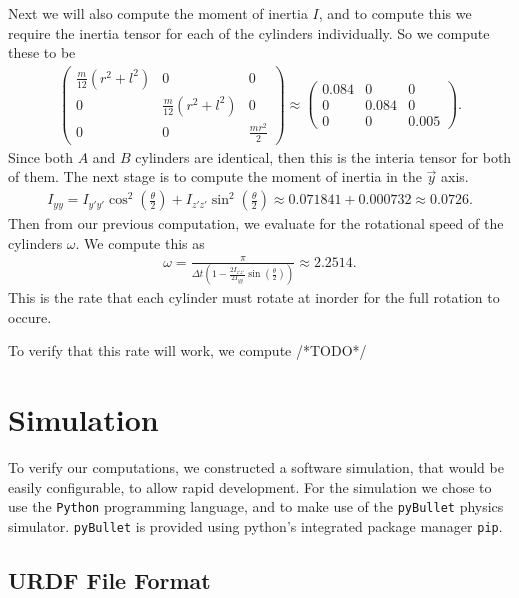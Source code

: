 \documentclass[12]{amsart}
\theoremstyle{definition}
\begin{document}
Next we will also compute the moment of inertia $I$, and to compute this
we require the inertia tensor for each of the cylinders individually. So we
compute these to be
\begin{align*}
   \begin{pmatrix}
     \frac{m}{12}\left(r^2+l^2\right) & 0 & 0\\
     0 & \frac{m}{12}\left(r^2+l^2\right) & 0\\
     0 & 0 & \frac{mr^2}{2}
   \end{pmatrix}\approx
   \begin{pmatrix}
     0.084 & 0 & 0\\
     0 & 0.084 & 0\\
     0 & 0 & 0.005
   \end{pmatrix}.
\end{align*}
Since both $A$ and $B$ cylinders are identical, then this is the interia tensor
for both of them. The next stage is to compute the moment of inertia in the
$\vec{y}$ axis.
\begin{align*}
   I_{yy}=I_{y'y'}\cos^2\left(\frac{\theta}{2}\right)+I_{z'z'}\sin^2\left(\frac{\theta}{2}\right)\approx0.071841+0.000732\approx0.0726.
\end{align*}
Then from our previous computation, we evaluate for the rotational speed of the
cylinders $\omega$. We compute this as
\begin{align*}
  \omega=\frac{\pi}{\Delta
    t\left(1-\frac{2I_{z'z'}}{2I_{yy}}\sin\left(\frac{\theta}{2}\right)\right)}\approx2.2514.
\end{align*}
This is the rate that each cylinder must rotate at inorder for the full
rotation to occure.

To verify that this rate will work, we compute
/*TODO*/

\section{Simulation}%
\label{sec:simulation}

To verify our computations, we constructed a software simulation, that would be
easily configurable, to allow rapid development. For the simulation we chose to
use the \texttt{Python} programming language, and to make use of the
\texttt{pyBullet} physics simulator. \texttt{pyBullet} is provided using
python's integrated package manager \texttt{pip}.

\subsection{URDF File Format}%
\label{sub:urdf_file_format}
\end{document}
